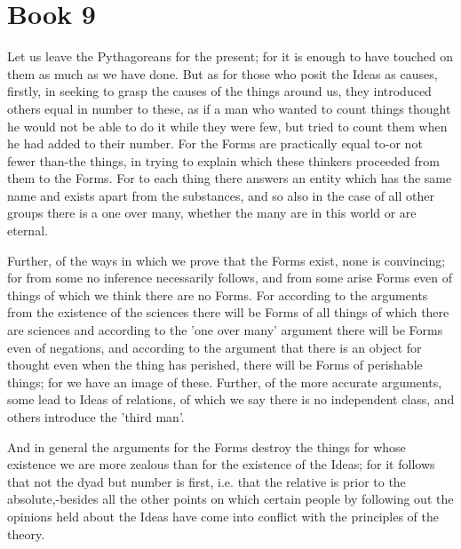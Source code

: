 \documentclass[oneside, 17pt, dvipsnames]{extbook}
\begin{document}
\newpage
\section{Book 9}

Let us leave the Pythagoreans for the present; for it is enough to have touched on them as much as we have done. But as for those who posit the Ideas as causes, firstly, in seeking to grasp the causes of the things around us, they introduced others equal in number to these, as if a man who wanted to count things thought he would not be able to do it while they were few, but tried to count them when he had added to their number. For the Forms are practically equal to-or not fewer than-the things, in trying to explain which these thinkers proceeded from them to the Forms. For to each thing there answers an entity which has the same name and exists apart from the substances, and so also in the case of all other groups there is a one over many, whether the many are in this world or are eternal.

Further, of the ways in which we prove that the Forms exist, none is convincing; for from some no inference necessarily follows, and from some arise Forms even of things of which we think there are no Forms. For according to the arguments from the existence of the sciences there will be Forms of all things of which there are sciences and according to the 'one over many' argument there will be Forms even of negations, and according to the argument that there is an object for thought even when the thing has perished, there will be Forms of perishable things; for we have an image of these. Further, of the more accurate arguments, some lead to Ideas of relations, of which we say there is no independent class, and others introduce the 'third man'.

And in general the arguments for the Forms destroy the things for whose existence we are more zealous than for the existence of the Ideas; for it follows that not the dyad but number is first, i.e. that the relative is prior to the absolute,-besides all the other points on which certain people by following out the opinions held about the Ideas have come into conflict with the principles of the theory.
\end{document}
